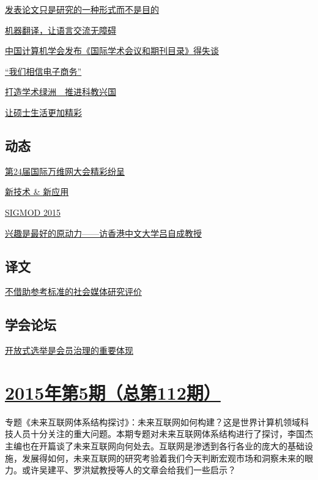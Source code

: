 \documentclass[a4paper]{article}
\begin{document}
\href{http://history.ccf.org.cn/resources/1190201776262/2015/07/13/6.pdf}{发表论文只是研究的一种形式而不是目的}

\href{http://history.ccf.org.cn/resources/1190201776262/2015/07/13/10.pdf}{机器翻译，让语言交流无障碍}

\href{http://history.ccf.org.cn/resources/1190201776262/2015/07/13/5.pdf}{中国计算机学会发布《国际学术会议和期刊目录》得失谈}

\href{http://history.ccf.org.cn/resources/1190201776262/2015/07/13/11.pdf}{“我们相信电子商务”}

\href{http://history.ccf.org.cn/resources/1190201776262/2015/07/13/7.pdf}{打造学术绿洲　推进科教兴国}

\href{http://history.ccf.org.cn/resources/1190201776262/2015/07/13/9.pdf}{让硕士生活更加精彩}

\subsection{动态}
\href{http://history.ccf.org.cn/resources/1190201776262/2015/07/13/14.pdf}{第24届国际万维网大会精彩纷呈}

\href{http://history.ccf.org.cn/resources/1190201776262/2015/07/13/15.pdf}{新技术 \& 新应用}

\href{http://history.ccf.org.cn/resources/1190201776262/2015/07/13/13.pdf}{SIGMOD 2015}

\href{http://history.ccf.org.cn/resources/1190201776262/2015/07/13/12.pdf}{兴趣是最好的原动力——访香港中文大学吕自成教授}

\subsection{译文}
\href{http://history.ccf.org.cn/resources/1190201776262/2015/07/13/16.pdf}{不借助参考标准的社会媒体研究评价}

\subsection{学会论坛}
\href{http://history.ccf.org.cn/resources/1190201776262/2015/07/13/17.pdf}{开放式选举是会员治理的重要体现}


\section{\href{http://history.ccf.org.cn/sites/ccf/jsjtbbd.jsp?contentId=2867635215085}{\textbf{2015年第5期（总第112期）}}}
专题《未来互联网体系结构探讨》：未来互联网如何构建？这是世界计算机领域科技人员十分关注的重大问题。本期专题对未来互联网体系结构进行了探讨，李国杰主编也在开篇谈了未来互联网向何处去。互联网是渗透到各行各业的庞大的基础设施，发展得如何，未来互联网的研究考验着我们今天判断宏观市场和洞察未来的眼力。或许吴建平、罗洪斌教授等人的文章会给我们一些启示？
\end{document}
